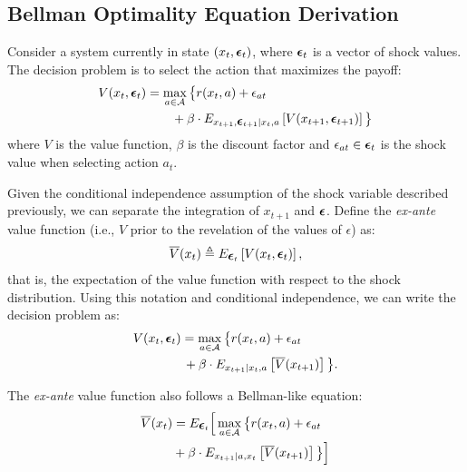 \documentclass{article}
\renewcommand{\vec}[1]{\mbox{\bm{$#1$}}}
\begin{document}
\subsection{Bellman Optimality Equation Derivation}

Consider a system currently in state $(x_t,\vec{\epsilon}_t)$, where $\vec{\epsilon}_t$ is a vector of shock values. The decision problem is to select the action that maximizes the payoff:
\begin{align}
\begin{split}
V(x_t,\vec{\epsilon}_t) & = \max_{a\in\mathcal{A}} \big\{r(x_t,a)+\epsilon_{at} \\
& \qquad + \beta \cdot E_{x_{t+1},\vec{\epsilon}_{t+1}|x_t,a} \left[V(x_{t+1},\vec{\epsilon}_{t+1})\right] \big\} \\
\end{split}
\end{align} 
where $V$ is the value function, $\beta$ is the discount factor and $\epsilon_{at} \in \vec{\epsilon}_t$ is the shock value when selecting action $a_t$.

Given the conditional independence assumption of the shock variable described previously, we can separate the integration of $x_{t+1}$ and $\vec{\epsilon}$. Define the \emph{ex-ante} value function (i.e., $V$ prior to the revelation of the values of $\epsilon$) as:
\begin{eqnarray}\label{eq:def_exante}
\overline{V}(x_t)
\triangleq 
E_{\vec{\epsilon}_t} \left[ V(x_t, \vec{\epsilon}_t) \right],
\end{eqnarray}
that is, the expectation of the value function with respect to the shock distribution. Using this notation and conditional independence, we can write the decision problem as:
%
\begin{align}
\begin{split}
V(x_t,\vec{\epsilon}_t) & =\max_{a\in\mathcal{A}} \big\{ \vphantom{V} r(x_t,a)+\epsilon_{at}  \\
&  \, +\beta \cdot E_{x_{t+1}|x_t,a} \left[ \overline{V}(x_{t+1}) \right] \vphantom{r(x_t, a)} \big\}.
\nonumber
\end{split}
\end{align}


The \emph{ex-ante} value function also follows a Bellman-like equation:
\begin{align} \label{eq:exantebellman}
\begin{split}
\overline{V}(x_t) & = E_{\vec{\epsilon}_t}\Big[\max_{a\in\mathcal{A}} \big\{r(x_t,a)+\epsilon_{at} \\
& +\beta  \cdot E_{x_{t+1}|a,x_t} \left[ \overline{V}(x_{t+1}) \right] \big\}\Big]
\end{split}
\end{align}
\end{document}
